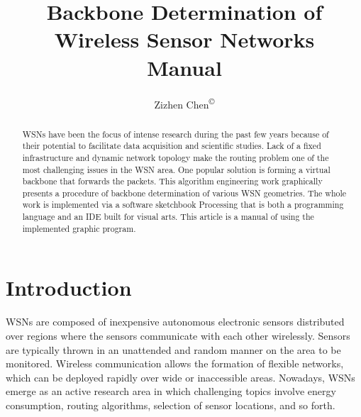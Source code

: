 \documentclass[11pt]{amsart}
\title{Backbone Determination of Wireless Sensor Networks\\Manual}
\author{Zizhen Chen\textsuperscript{\copyright}}
\begin{document}
\maketitle
\begin{abstract}
\acp{WSN} have been the focus of intense research during the past few years because of their potential to facilitate data acquisition and scientific studies\cite{werner2006deploying}. Lack of a fixed infrastructure and dynamic network topology make the routing problem one of the most challenging issues in the \ac{WSN} area. One popular solution is forming a virtual backbone that forwards the packets. This algorithm engineering work graphically presents a procedure of backbone determination of various \ac{WSN} geometries. The whole work is implemented via a software sketchbook Processing that is both a programming language and an \ac{IDE} built for visual arts\cite{reas2007processing}. This article is a manual of using the implemented graphic program.
\end{abstract}
\section{Introduction}
\acfp{WSN} are composed of inexpensive autonomous electronic sensors distributed over regions where the sensors communicate with each other wirelessly. Sensors are typically thrown in an unattended and random manner on the area to be monitored. Wireless communication allows the formation of flexible networks, which can be deployed rapidly over wide or inaccessible areas. Nowadays, WSNs emerge as an active research area in which challenging topics involve energy consumption, routing algorithms, selection of sensor locations, and so forth\cite{carlos2016wireless}.
\end{document}
